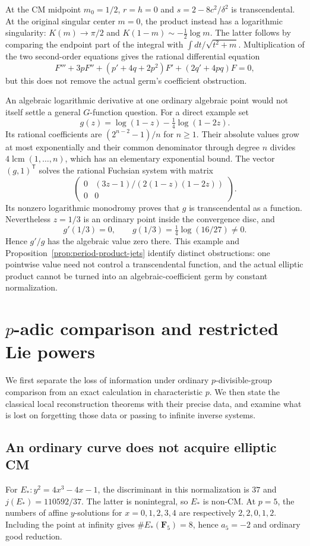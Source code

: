 \documentclass[11pt]{article}
\theoremstyle{definition}\newtheorem{definition}[theorem]{Definition}
\theoremstyle{remark}\newtheorem{remark}[theorem]{Remark}
\begin{document}
At the CM midpoint $m_0=1/2$, $r=h=0$ and $s=2-8c^2/\delta^2$ is transcendental. At the original singular center $m=0$, the product instead has a logarithmic singularity: $K(m)\to\pi/2$ and $K(1-m)\sim-\tfrac12\log m$. The latter follows by comparing the endpoint part of the integral with $\int dt/\sqrt{t^2+m}$. Multiplication of the two second-order equations gives the rational differential equation
\[
 F'''+3pF''+(p'+4q+2p^2)F'+(2q'+4pq)F=0,
\]
but this does not remove the actual germ's coefficient obstruction.

An algebraic logarithmic derivative at one ordinary algebraic point would not itself settle a general $G$-function question. For a direct example set
\[
                   g(z)=\log(1-z)-\tfrac14\log(1-2z).
\]
Its rational coefficients are $(2^{n-2}-1)/n$ for $n\ge1$. Their absolute values grow at most exponentially and their common denominator through degree $n$ divides $4\operatorname{lcm}(1,\ldots,n)$, which has an elementary exponential bound. The vector $(g,1)^{\mathsf T}$ solves the rational Fuchsian system with matrix
\[
 \begin{pmatrix}0&(3z-1)/(2(1-z)(1-2z))\\0&0\end{pmatrix}.
\]
Its nonzero logarithmic monodromy proves that $g$ is transcendental as a function. Nevertheless $z=1/3$ is an ordinary point inside the convergence disc, and
\[
                     g'(1/3)=0,\qquad
                     g(1/3)=\tfrac14\log(16/27)\ne0.
\]
Hence $g'/g$ has the algebraic value zero there. This example and Proposition~\ref{prop:period-product-jets} identify distinct obstructions: one pointwise value need not control a transcendental function, and the actual elliptic product cannot be turned into an algebraic-coefficient germ by constant normalization.


\section{\texorpdfstring{$p$}{p}-adic comparison and restricted Lie powers}
We first separate the loss of information under ordinary $p$-divisible-group comparison from an exact calculation in characteristic $p$. We then state the classical local reconstruction theorems with their precise data, and examine what is lost on forgetting those data or passing to infinite inverse systems.

\subsection{An ordinary curve does not acquire elliptic CM}
For $E_*:y^2=4x^3-4x-1$, the discriminant in this normalization is $37$ and $j(E_*)=110592/37$. The latter is nonintegral, so $E_*$ is non-CM. At $p=5$, the numbers of affine $y$-solutions for $x=0,1,2,3,4$ are respectively $2,2,0,1,2$. Including the point at infinity gives $\#E_*(\mathbf F_5)=8$, hence $a_5=-2$ and ordinary good reduction.
\end{document}

